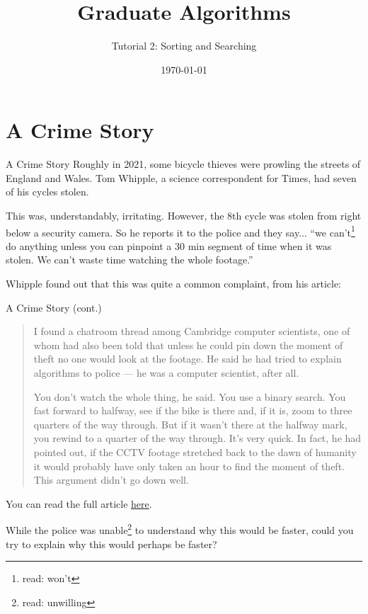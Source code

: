 \documentclass[9pt]{beamer}
\title{Graduate Algorithms}
\subtitle{Tutorial 2: Sorting and Searching}
\author{}
\date{\today}
\begin{document}
\begin{frame}
\titlepage
\end{frame}

\section{A Crime Story}

\begin{frame}{A Crime Story}
Roughly in 2021, some bicycle thieves were prowling the streets of England and Wales. Tom Whipple, a science correspondent for Times, had seven of his cycles stolen.

This was, understandably, irritating. However, the 8th cycle was stolen from right below a security camera. So he reports it to the police and they say... ``we can't\footnote{read: won't} do anything unless you can pinpoint a 30 min segment of time when it was stolen. We can't waste time watching the whole footage.''

Whipple found out that this was quite a common complaint, from his article:
\end{frame}

\begin{frame}{A Crime Story (cont.)}
\begin{quote}
\small
I found a chatroom thread among Cambridge computer scientists, one of whom had also been told that unless he could pin down the moment of theft no one would look at the footage. He said he had tried to explain algorithms to police --- he was a computer scientist, after all.

You don't watch the whole thing, he said. You use a binary search. You fast forward to halfway, see if the bike is there and, if it is, zoom to three quarters of the way through. But if it wasn't there at the halfway mark, you rewind to a quarter of the way through. It's very quick. In fact, he had pointed out, if the CCTV footage stretched back to the dawn of humanity it would probably have only taken an hour to find the moment of theft. This argument didn't go down well.
\end{quote}

You can read the full article \href{https://www.thetimes.com/uk/law/article/i-have-owned-11-bikes-this-is-how-they-were-stolen-d3r553gx3}{here}.

While the police was unable\footnote{read: unwilling} to understand why this would be faster, could you try to explain why this would perhaps be faster?
\end{frame}
\end{document}
